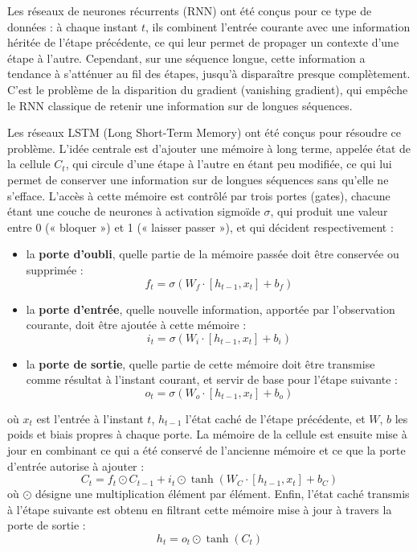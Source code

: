 \documentclass[a4paper,12pt, oneside]{article}
\begin{document}
Les réseaux de neurones récurrents (RNN) ont été conçus pour ce type de données : à chaque instant $t$, ils combinent l'entrée courante avec une information héritée de l'étape précédente, ce qui leur permet de propager un contexte d'une étape à l'autre. Cependant, sur une séquence longue, cette information a tendance à s'atténuer au fil des étapes, jusqu'à disparaître presque complètement. C'est le problème de la disparition du gradient (vanishing gradient), qui empêche le RNN classique de retenir une information sur de longues séquences.

Les réseaux LSTM (Long Short-Term Memory) ont été conçus pour résoudre ce problème. L'idée centrale est d'ajouter une mémoire à long terme, appelée état de la cellule $C_t$, qui circule d'une étape à l'autre en étant peu modifiée, ce qui lui permet de conserver une information sur de longues séquences sans qu'elle ne s'efface. L'accès à cette mémoire est contrôlé par trois portes (gates), chacune étant une couche de neurones à activation sigmoïde $\sigma$, qui produit une valeur entre 0 (« bloquer ») et 1 (« laisser passer »), et qui décident respectivement :

\begin{itemize}
\item la \textbf{porte d'oubli}, quelle partie de la mémoire passée doit être conservée ou supprimée :
\[
f_t = \sigma(W_f \cdot [h_{t-1}, x_t] + b_f)
\]
\item la \textbf{porte d'entrée}, quelle nouvelle information, apportée par l'observation courante, doit être ajoutée à cette mémoire :
\[
i_t = \sigma(W_i \cdot [h_{t-1}, x_t] + b_i)
\]
\item la \textbf{porte de sortie}, quelle partie de cette mémoire doit être transmise comme résultat à l'instant courant, et servir de base pour l'étape suivante :
\[
o_t = \sigma(W_o \cdot [h_{t-1}, x_t] + b_o)
\]
\end{itemize}

où $x_t$ est l'entrée à l'instant $t$, $h_{t-1}$ l'état caché de l'étape précédente, et $W$, $b$ les poids et biais propres à chaque porte. La mémoire de la cellule est ensuite mise à jour en combinant ce qui a été conservé de l'ancienne mémoire et ce que la porte d'entrée autorise à ajouter :
\[
C_t = f_t \odot C_{t-1} + i_t \odot \tanh(W_C \cdot [h_{t-1}, x_t] + b_C)
\]
où $\odot$ désigne une multiplication élément par élément. Enfin, l'état caché transmis à l'étape suivante est obtenu en filtrant cette mémoire mise à jour à travers la porte de sortie :
\[
h_t = o_t \odot \tanh(C_t)
\]
\end{document}
